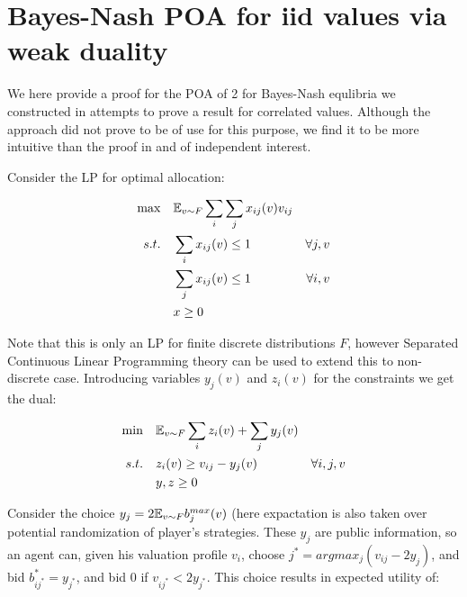 \section{Bayes-Nash POA for iid values via weak duality} 
We here provide a proof for the POA of 2 for Bayes-Nash equlibria we constructed in attempts to prove a result for correlated values. Although the approach did not prove to be of use for this purpose, we find it to be more intuitive than the proof in \cite{survey} and of independent interest.

Consider the LP for optimal allocation:

\begin{align*}
\max \quad &{\mathbb{E}}_{v\sim F} \sum_i\sum_j x_{ij}(v)v_{ij}\\
s.t.\quad & \sum_i x_{ij}(v)\leq 1 \quad &\forall j,v\\
& \sum_j x_{ij}(v)\leq 1 \quad &\forall i,v\\
&x\geq0
\end{align*}

Note that this is only an LP for finite discrete distributions $F$, however Separated Continuous Linear Programming theory can be used to extend this to non-discrete case. Introducing variables $y_j(v)$ and $z_i(v)$ for the constraints we get the dual:

\begin{align*}
\min \quad &{\mathbb{E}}_{v\sim F} \sum_i z_i(v) + \sum_j y_j(v)\\
s.t.\quad & z_i(v)\geq v_{ij}-y_j(v) &\forall i,j,v\\
&y,z\geq0
\end{align*}

%

Consider the choice $y_j = 2{\mathbb{E}}_{v\sim F} b_j^{max} (v)$ (here expactation is also taken over potential randomization of player's strategies. These $y_j$ are public information, so an agent can, given his valuation profile $v_i$, choose $j^* = argmax_j (v_{ij}-2y_j)$, and bid $b^*_{ij^*} = y_{j^*}$, and bid 0 if $v_{ij^*}<2y_{j^*}$. This choice results in expected utility of:

